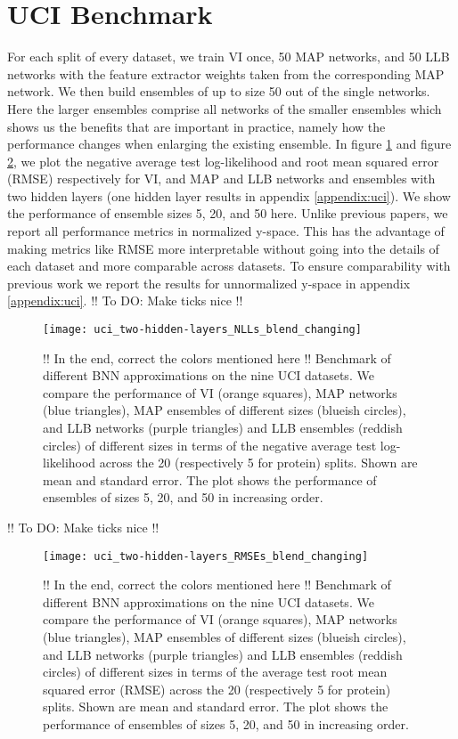 \documentclass[../thesis.tex]{subfiles}
\begin{document}
\section{UCI Benchmark}
For each split of every dataset, we train VI once, 50 MAP networks, and 50 LLB networks with the feature extractor weights taken from the corresponding MAP network. We then build ensembles of up to size 50 out of the single networks. Here the larger ensembles comprise all networks of the smaller ensembles which shows us the benefits that are important in practice, namely how the performance changes when enlarging the existing ensemble. In figure \ref{fig:uci-benchmark-nll} and figure \ref{fig:uci-benchmark-rmse}, we plot the negative average test log-likelihood and root mean squared error (RMSE) respectively for VI, and MAP and LLB networks and ensembles with two hidden layers (one hidden layer results in appendix \ref{appendix:uci}). We show the performance of ensemble sizes 5, 20, and 50 here. Unlike previous papers, we report all performance metrics in normalized y-space. This has the advantage of making metrics like RMSE more interpretable without going into the details of each dataset and more comparable across datasets. To ensure comparability with previous work we report the results for unnormalized y-space in appendix \ref{appendix:uci}.
!! To DO: Make ticks nice !!
\begin{figure}
    \centering
    \texttt{[image: uci\_two-hidden-layers\_NLLs\_blend\_changing]} 
    \caption{!! In the end, correct the colors mentioned here !! Benchmark of different BNN approximations on the nine UCI datasets. We compare the performance of VI (orange squares), MAP networks (blue triangles), MAP ensembles of different sizes (blueish circles), and LLB networks (purple triangles) and LLB ensembles (reddish circles) of different sizes in terms of the negative average test log-likelihood across the 20 (respectively 5 for protein) splits. Shown are mean and standard error. The plot shows the performance of ensembles of sizes 5, 20, and 50 in increasing order.}
    \label{fig:uci-benchmark-nll}
\end{figure}
!! To DO: Make ticks nice !!
\begin{figure}
    \centering
    \texttt{[image: uci\_two-hidden-layers\_RMSEs\_blend\_changing]} 
    \caption{!! In the end, correct the colors mentioned here !! Benchmark of different BNN approximations on the nine UCI datasets. We compare the performance of VI (orange squares), MAP networks (blue triangles), MAP ensembles of different sizes (blueish circles), and LLB networks (purple triangles) and LLB ensembles (reddish circles) of different sizes in terms of the average test root mean squared error (RMSE) across the 20 (respectively 5 for protein) splits. Shown are mean and standard error. The plot shows the performance of ensembles of sizes 5, 20, and 50 in increasing order.}
    \label{fig:uci-benchmark-rmse}
\end{figure}
\end{document}
